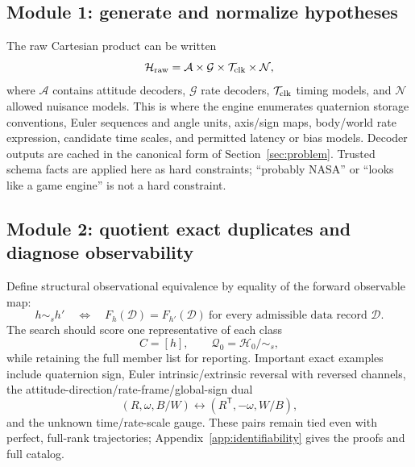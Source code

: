 \documentclass[11pt]{article}
\begin{document}
    \subsection{Module 1: generate and normalize hypotheses}

    The raw Cartesian product can be written
    \begin{equation}
        \mathcal H_{\mathrm{raw}}
        =\mathcal A\times\mathcal G\times\mathcal T_{\rm clk}\times\mathcal N,
        \label{eq:raw-cartesian}
    \end{equation}
    where $\mathcal A$ contains attitude decoders, $\mathcal G$ rate decoders,
    $\mathcal T_{\rm clk}$ timing models, and $\mathcal N$ allowed nuisance models. This is where the
    engine enumerates quaternion storage conventions, Euler sequences and angle units,
    axis/sign maps, body/world rate expression, candidate time scales, and permitted latency
    or bias models. Decoder outputs are cached in the canonical form of
    Section~\ref{sec:problem}. Trusted schema facts are applied here as hard constraints;
    ``probably NASA'' or ``looks like a game engine'' is not a hard constraint.

    \subsection{Module 2: quotient exact duplicates and diagnose observability}

    Define structural observational equivalence by equality of the forward observable map:
    \begin{equation}
        h\sim_s h'
        \quad\Longleftrightarrow\quad
        F_h(\mathcal D)=F_{h'}(\mathcal D)
        \ \text{for every admissible data record }\mathcal D.
        \label{eq:structural-equivalence-focused}
    \end{equation}
    The search should score one representative of each class
    \begin{equation}
        C=[h],\qquad \mathcal Q_0=\mathcal H_0/\!\sim_s,
        \label{eq:focused-quotient}
    \end{equation}
    while retaining the full member list for reporting. Important exact examples include
    quaternion sign, Euler intrinsic/extrinsic reversal with reversed channels, the
    attitude-direction/rate-frame/global-sign dual
    \begin{equation}
        (R,\omega,B/W)\longleftrightarrow(R^{\mathsf T},-\omega,W/B),
        \label{eq:focused-global-dual}
    \end{equation}
    and the unknown time/rate-scale gauge. These pairs remain tied even with perfect,
    full-rank trajectories; Appendix~\ref{app:identifiability} gives the proofs and full
    catalog.
\end{document}
